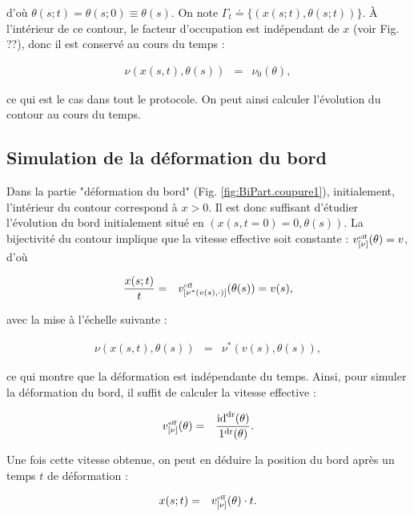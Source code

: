 d’où $\theta(s;t) = \theta(s;0) \equiv \theta(s)$. On note $\Gamma_t \doteq \{(x(s;t), \theta(s;t))\}$. À l’intérieur de ce contour, le facteur d’occupation est indépendant de $x$ (voir Fig. ??), donc il est conservé au cours du temps :

\begin{eqnarray*}
	\nu(x(s,t), \theta(s)) & = & \nu_0(\theta),
\end{eqnarray*}

ce qui est le cas dans tout le protocole. On peut ainsi calculer l’évolution du contour au cours du temps.


\subsection{Simulation de la déformation du bord} 

Dans la partie "déformation du bord" (Fig. \ref{fig:BiPart.coupure1}), initialement, l'intérieur du contour correspond à $x > 0$. Il est donc suffisant d'étudier l'évolution du bord initialement situé en $(x(s, t = 0 ) = 0 , \theta(s))$. La bijectivité du contour implique que la vitesse effective soit constante : $v_{[\nu]}^{\mbox{\tiny eff}} ( \theta  ) = v$, d'où

\begin{eqnarray*}
	\frac{x(s;t)}{t} & = &	v_{[\nu^\ast (  v(s) , \cdot )]}^{\mbox{\tiny eff}} ( \theta(s)  ) = v(s),
\end{eqnarray*}

avec la mise à l’échelle suivante :

\begin{eqnarray*}
	\nu(x(s,t),\theta(s)) & = &  \nu^\ast(v(s),\theta(s)),
\end{eqnarray*}

ce qui montre que la déformation est indépendante du temps. Ainsi, pour simuler la déformation du bord, il suffit de calculer la vitesse effective :

\begin{eqnarray*}
	v_{[\nu]}^{\mbox{\tiny eff}} ( \theta  ) & = & \frac{\mathrm{id}^{\mathrm{dr}}(\theta)}{\mathrm{1}^{\mathrm{dr}}(\theta)}.
\end{eqnarray*}

Une fois cette vitesse obtenue, on peut en déduire la position du bord après un temps $t$ de déformation :

\begin{eqnarray*}
	x(s;t) & = & v_{[\nu]}^{\mbox{\tiny eff}} ( \theta  ) \cdot t.	
\end{eqnarray*}

